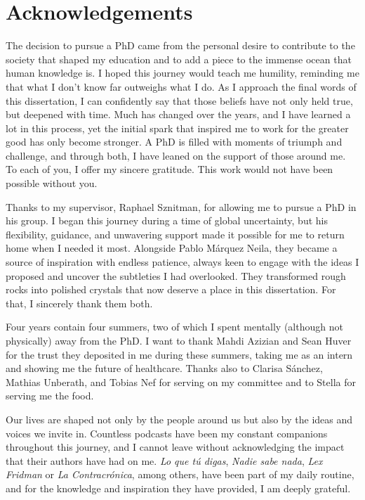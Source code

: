 \chapter*{Acknowledgements}

The decision to pursue a PhD came from the personal desire to contribute to the society that shaped my education and to add a piece to the immense ocean that human knowledge is. I hoped this journey would teach me humility, reminding me that what I don’t know far outweighs what I do. As I approach the final words of this dissertation, I can confidently say that those beliefs have not only held true, but deepened with time. Much has changed over the years, and I have learned a lot in this process, yet the initial spark that inspired me to work for the greater good has only become stronger. A PhD is filled with moments of triumph and challenge, and through both, I have leaned on the support of those around me. To each of you, I offer my sincere gratitude. This work would not have been possible without you.

Thanks to my supervisor, Raphael Sznitman, for allowing me to pursue a PhD in his group. I began this journey during a time of global uncertainty, but his flexibility, guidance, and unwavering support made it possible for me to return home when I needed it most. Alongside Pablo Márquez Neila, they became a source of inspiration with endless patience, always keen to engage with the ideas I proposed and uncover the subtleties I had overlooked. They transformed rough rocks into polished crystals that now deserve a place in this dissertation. For that, I sincerely thank them both.

Four years contain four summers, two of which I spent mentally (although not physically) away from the PhD. I want to thank Mahdi Azizian and Sean Huver for the trust they deposited in me during these summers, taking me as an intern and showing me the future of healthcare. Thanks also to Clarisa Sánchez, Mathias Unberath, and Tobias Nef for serving on my committee and to Stella\textsuperscript{\textcopyright} for serving me the food.

Our lives are shaped not only by the people around us but also by the ideas and voices we invite in. Countless podcasts have been my constant companions throughout this journey, and I cannot leave without acknowledging the impact that their authors have had on me. \textit{Lo que tú digas}, \textit{Nadie sabe nada}, \textit{Lex Fridman} or \textit{La Contracrónica}, among others, have been part of my daily routine, and for the knowledge and inspiration they have provided, I am deeply grateful.

